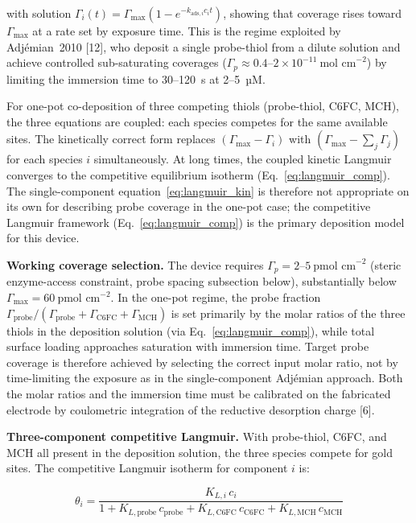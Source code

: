 \documentclass[10pt,a4paper]{article}
\numberwithin{equation}{section}
\newcommand{\cit}[1]{[#1]}   %
\begin{document}
with solution $\Gamma_i(t) = \Gamma_{\max}(1 - e^{-k_{\text{ads},i}c_i t})$, showing
that coverage rises toward $\Gamma_{\max}$ at a rate set by exposure time. This is the
regime exploited by Adj\'{e}mian~2010 \cit{12}, who deposit a single probe-thiol from a
dilute solution and achieve controlled sub-saturating coverages
($\Gamma_p \approx 0.4\text{--}2 \times 10^{-11}\ \text{mol~cm}^{-2}$) by limiting
the immersion time to 30--120~s at 2--5~µM.

For one-pot co-deposition of three competing thiols (probe-thiol, C6FC, MCH), the
three equations are coupled: each species competes for the same available sites. The
kinetically correct form replaces $(\Gamma_{\max} - \Gamma_i)$ with
$(\Gamma_{\max} - \sum_j \Gamma_j)$ for each species $i$ simultaneously. At long
times, the coupled kinetic Langmuir converges to the competitive equilibrium isotherm
(Eq.~\eqref{eq:langmuir_comp}). The single-component equation~\eqref{eq:langmuir_kin}
is therefore not appropriate on its own for describing probe coverage in the one-pot
case; the competitive Langmuir framework (Eq.~\eqref{eq:langmuir_comp}) is the
primary deposition model for this device.

\textbf{Working coverage selection.} The device requires
$\Gamma_p = 2\text{--}5\ \text{pmol~cm}^{-2}$ (steric enzyme-access constraint,
probe spacing subsection below), substantially below $\Gamma_{\max} = 60\ \text{pmol~cm}^{-2}$.
In the one-pot regime, the probe fraction $\Gamma_{\text{probe}} /
(\Gamma_{\text{probe}} + \Gamma_{\text{C6FC}} + \Gamma_{\text{MCH}})$ is set
primarily by the molar ratios of the three thiols in the deposition solution (via
Eq.~\eqref{eq:langmuir_comp}), while total surface loading approaches saturation with
immersion time. Target probe coverage is therefore achieved by selecting the correct
input molar ratio, not by time-limiting the exposure as in the single-component Adj\'{e}mian
approach. Both the molar ratios and the immersion time must be calibrated on the
fabricated electrode by coulometric integration of the reductive desorption charge \cit{6}.

\textbf{Three-component competitive Langmuir.} With probe-thiol, C6FC, and MCH all
present in the deposition solution, the three species compete for gold sites.
The competitive Langmuir isotherm for component $i$ is:

\begin{equation}
  \theta_i = \frac{K_{L,i}\,c_i}{1 + K_{L,\text{probe}}\,c_{\text{probe}}
                                    + K_{L,\text{C6FC}}\,c_{\text{C6FC}}
                                    + K_{L,\text{MCH}}\,c_{\text{MCH}}}
  \label{eq:langmuir_comp}
\end{equation}
\end{document}
